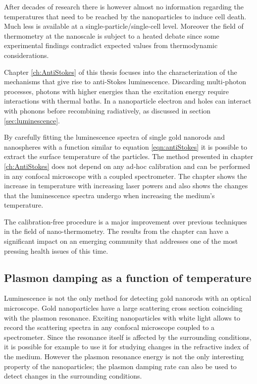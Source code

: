 After decades of research there is however almost no information regarding the
temperatures that need to be reached by the nanoparticles to induce cell death.
Much less is available at a single-particle/single-cell level. Moreover the
field of thermometry at the nanoscale is subject to a heated
debate\cite{Yang2011a,Suzuki2015} since some experimental
findings\cite{Yang2011a} contradict expected values from thermodynamic
considerations\cite{Sato2014}.

Chapter \ref{ch:AntiStokes} of this thesis focuses into the characterization of
the mechanisms that give rise to anti-Stokes luminescence. Discarding
multi-photon processes, photons with higher energies than the excitation energy
require interactions with thermal baths. In a nanoparticle electron and holes
can interact with phonons before recombining radiatively, as discussed in
section \ref{sec:luminescence}.

By carefully fitting the luminescence spectra of single gold nanorods and
nanospheres with a function similar to equation \ref{eqn:antiStokes} it is
possible to extract the surface temperature of the particles. The method
presented in chapter \ref{ch:AntiStokes} does not depend on any ad-hoc
calibration and can be performed in any confocal microscope with a coupled
spectrometer. The chapter shows the increase in temperature with increasing
laser powers and also shows the changes that the luminescence spectra undergo
when increasing the medium's temperature.

The calibration-free procedure is a major improvement over previous techniques
in the field of nano-thermometry. The results from the chapter can have a
significant impact on an emerging community that addresses one of the most
pressing health issues of this time.

\subsection{Plasmon damping as a function of temperature}
Luminescence is not the only method for detecting gold nanorods with an optical
microscope. Gold nanoparticles have a large scattering cross section coinciding
with the plasmon resonance. Exciting nanoparticles with white light allows to
record the scattering spectra in any confocal microscope coupled to a
spectrometer. Since the resonance itself is affected by the surrounding
conditions\cite{Liu2009b,Konrad2013}, it is possible for example to use it for
studying changes in the refractive index of the medium. However the plasmon
resonance energy is not the only interesting property of the nanoparticles; the
plasmon damping rate can also be used to detect changes in the surrounding
conditions.

